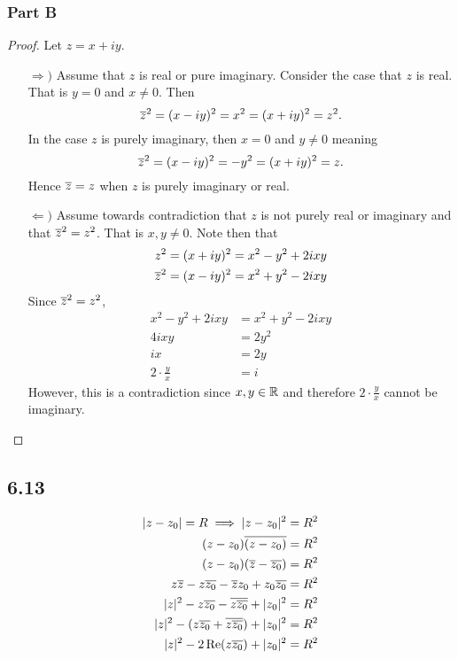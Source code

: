 \documentclass[12pt,titlepage]{extarticle}
\begin{document}
\subsubsection*{Part B}
\begin{proof}
    Let $z = x + iy$.
    \begin{enumerate}
        \item[$\Rightarrow)$]
            Assume that $z$ is real or pure imaginary. Consider the case that $z$ is real. That is $y = 0$ and $x \neq 0$. Then
            \[
                \overline{z}^2 = (x-iy)^2 = x^2 = (x + iy)^2 = z^2
            .\]
            In the case $z$ is purely imaginary, then $x = 0$ and $y \neq 0$ meaning
            \[
                \overline{z}^2 = (x - iy)^2 = -y^2 = (x + iy)^2 = z
            .\]
            Hence $\overline{z} = z$ when $z$ is purely imaginary or real.

        \item[$\Leftarrow)$]
            Assume towards contradiction that $z$ is not purely real or imaginary and that $\overline{z}^2 = z^2$. That is $x,y \neq 0$. Note then that
            \begin{align*}
                z^2       &= (x + iy)^2 = x^2 - y^2 + 2ixy \\
                \overline{z}^2 &= (x - iy)^2 = x^2 + y^2 - 2ixy
            \end{align*}
            Since $\overline{z}^2 = z^2$,
            \begin{align*}
                x^2 - y^2 + 2ixy &= x^2 + y^2 - 2ixy \\
                4ixy &= 2y^2 \\
                ix &= 2y \\
                2 \cdot \frac{y}{x} &= i
            \end{align*}
            However, this is a contradiction since $x,y \in \mathbb{R}$ and therefore $2 \cdot \frac{y}{x}$ cannot be imaginary.
    \end{enumerate}
\end{proof}


\subsection*{6.13}
\begin{align*}
    |z - z_0| = R \implies |z - z_0|^2 &= R^2 \\
    (z - z_0)\overline{(z - z_0)} &= R^2 \\
    (z - z_0) (\overline{z} - \overline{z_0}) &= R^2 \\
    z \overline{z} - z \overline{z_0} - \overline{z} z_0 + z_0 \overline{z_0} &= R^2 \\
    |z|^2 - z \overline{z_0} - \overline{z \overline{z_0}} + |z_0|^2 &= R^2 \\
    |z|^2 - (z \overline{z_0} + \overline{z \overline{z_0}}) + |z_0|^2 &= R^2 \\
    |z|^2 - 2 \Re(z \overline{z_0}) + |z_0|^2 &= R^2
\end{align*}
\end{document}
